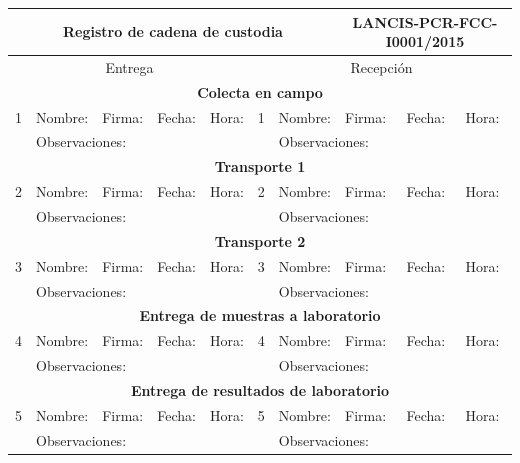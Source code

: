 \documentclass{article}
\begin{document}
\begin{center}
	\begin{tabular}{|p{0.1cm}|p{2.7cm}|p{1.4cm}|p{1.4cm}|p{1cm}|p{0.1cm}|p{2.7cm}|p{1.4cm}|p{1.4cm}|p{1cm}|}
	    \hline 
	    \multicolumn{7}{|c|}{\textbf{Registro de cadena de custodia}} & \multicolumn{3}{c|}{{\color{red}LANCIS-PCR-FCC-I0001/2015}} \\ 
	    \hline 
	    \multicolumn{5}{|c|}{Entrega} & \multicolumn{5}{|c|}{Recepción}\\ 
	    \hline 
	    
	     \multicolumn{10}{|c|}{\cellcolor{gainsboro}\textbf{Colecta en campo} } \\
	    
	    \hline 
	    1 & Nombre: & Firma: & Fecha: & Hora: & 1 & Nombre: & Firma: & Fecha: & Hora: \\[2.6ex] 
	    \hline 
	     & \multicolumn{4}{l|}{Observaciones:} &  & \multicolumn{4}{l|}{Observaciones:}  \\[2.6ex] 
	    \hline 
	    \multicolumn{10}{|c|}{\cellcolor{gainsboro}\textbf{Transporte 1} } \\
	    \hline 
	    2 & Nombre: & Firma: & Fecha: & Hora: & 2 & Nombre: & Firma: & Fecha: & Hora: \\[2.6ex] 
	    \hline 
	    & \multicolumn{4}{l|}{Observaciones:} &  & \multicolumn{4}{l|}{Observaciones:}  \\[2.6ex] 
	    \hline 
	    \multicolumn{10}{|c|}{\cellcolor{gainsboro}\textbf{Transporte 2} } \\
	    \hline 
	    3 & Nombre: & Firma: & Fecha: & Hora: & 3 & Nombre: & Firma: & Fecha: & Hora: \\[2.6ex]  
	    \hline 
	    & \multicolumn{4}{l|}{Observaciones:} &  & \multicolumn{4}{l|}{Observaciones:}  \\[2.6ex] 
	    \hline 
	    \multicolumn{10}{|c|}{\cellcolor{gainsboro}\textbf{Entrega de muestras a laboratorio}} \\
	    \hline 
	    4 & Nombre: & Firma: & Fecha: & Hora: & 4 & Nombre: & Firma: & Fecha: & Hora: \\[2.6ex] 
	    \hline 
	    & \multicolumn{4}{l|}{Observaciones:} &  & \multicolumn{4}{l|}{Observaciones:}  \\[2.6ex] 
	    \hline 
	    \multicolumn{10}{|c|}{\cellcolor{gainsboro}\textbf{Entrega de resultados de laboratorio} } \\
	    \hline 
	    5 & Nombre: & Firma: & Fecha: & Hora: & 5 & Nombre: & Firma: & Fecha: & Hora: \\[2.6ex] 
	    \hline 
	    & \multicolumn{4}{l|}{Observaciones:} &  & \multicolumn{4}{l|}{Observaciones:}  \\[2.6ex] 

\end{tabular}
\end{center}
\end{document}
